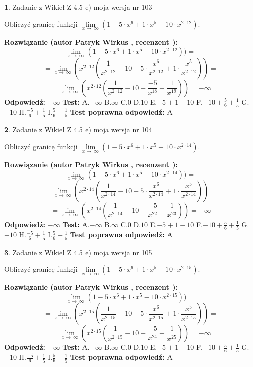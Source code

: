 \documentclass[12pt, a4paper]{article}
\theoremstyle{definition} %
\newtheorem{zad}{}
\newcommand{\zadStart}[1]{\begin{zad}#1\newline}
\newcommand{\zadStop}{\end{zad}}
\newcommand{\rozwStart}[2]{\noindent \textbf{Rozwiązanie (autor #1 , recenzent #2): }\newline}
\newcommand{\rozwStop}{\newline}
\newcommand{\odpStart}{\noindent \textbf{Odpowiedź:}\newline}
\newcommand{\odpStop}{\newline}
\newcommand{\testStart}{\noindent \textbf{Test:}\newline}
\newcommand{\testStop}{\newline}
\newcommand{\kluczStart}{\noindent \textbf{Test poprawna odpowiedź:}\newline}
\newcommand{\kluczStop}{\newline}
\begin{document}
\zadStart{Zadanie z Wikieł Z 4.5 e) moja wersja nr 103}



Obliczyć granicę funkcji  $\lim\limits_{x\to\ \infty}(1 - 5 \cdot x^{6}+1 \cdot x^{5}- 10 \cdot x^{2\cdot12})$.
\zadStop
\rozwStart{Patryk Wirkus}{}
$$\lim\limits_{x\to\ \infty}(1 - 5 \cdot x^{6}+1 \cdot x^{5}- 10 \cdot x^{2\cdot12}))=$$
$$=\lim\limits_{x\to\ \infty}(x^{2\cdot12}(\frac{1}{x^{2\cdot12}}-10 -5 \cdot \frac{x^{6}}{x^{2\cdot12}}+1 \cdot \frac{x^{5}}{x^{2\cdot12}}))=$$
$$=\lim\limits_{x\to\ \infty}(x^{2\cdot12}(\frac{1}{x^{2\cdot12}}-10 + \frac{-5}{x^{18}}+ \frac{1}{x^{19}}))=-\infty$$
\rozwStop
\odpStart
$-\infty$
\odpStop
\testStart
A.$-\infty$ B.$\infty$ C.$0$ D.$10$ E.$-5 + 1 - 10$
F.$-10+\frac{5}{6}+\frac{1}{5}$ G.$-10$
H.$\frac{-5}{6}+\frac{1}{5}$
I.$\frac{5}{6}+\frac{1}{5}$
\testStop
\kluczStart
A
\kluczStop



\zadStart{Zadanie z Wikieł Z 4.5 e) moja wersja nr 104}



Obliczyć granicę funkcji  $\lim\limits_{x\to\ \infty}(1 - 5 \cdot x^{6}+1 \cdot x^{5}- 10 \cdot x^{2\cdot14})$.
\zadStop
\rozwStart{Patryk Wirkus}{}
$$\lim\limits_{x\to\ \infty}(1 - 5 \cdot x^{6}+1 \cdot x^{5}- 10 \cdot x^{2\cdot14}))=$$
$$=\lim\limits_{x\to\ \infty}(x^{2\cdot14}(\frac{1}{x^{2\cdot14}}-10 -5 \cdot \frac{x^{6}}{x^{2\cdot14}}+1 \cdot \frac{x^{5}}{x^{2\cdot14}}))=$$
$$=\lim\limits_{x\to\ \infty}(x^{2\cdot14}(\frac{1}{x^{2\cdot14}}-10 + \frac{-5}{x^{22}}+ \frac{1}{x^{23}}))=-\infty$$
\rozwStop
\odpStart
$-\infty$
\odpStop
\testStart
A.$-\infty$ B.$\infty$ C.$0$ D.$10$ E.$-5 + 1 - 10$
F.$-10+\frac{5}{6}+\frac{1}{5}$ G.$-10$
H.$\frac{-5}{6}+\frac{1}{5}$
I.$\frac{5}{6}+\frac{1}{5}$
\testStop
\kluczStart
A
\kluczStop



\zadStart{Zadanie z Wikieł Z 4.5 e) moja wersja nr 105}



Obliczyć granicę funkcji  $\lim\limits_{x\to\ \infty}(1 - 5 \cdot x^{6}+1 \cdot x^{5}- 10 \cdot x^{2\cdot15})$.
\zadStop
\rozwStart{Patryk Wirkus}{}
$$\lim\limits_{x\to\ \infty}(1 - 5 \cdot x^{6}+1 \cdot x^{5}- 10 \cdot x^{2\cdot15}))=$$
$$=\lim\limits_{x\to\ \infty}(x^{2\cdot15}(\frac{1}{x^{2\cdot15}}-10 -5 \cdot \frac{x^{6}}{x^{2\cdot15}}+1 \cdot \frac{x^{5}}{x^{2\cdot15}}))=$$
$$=\lim\limits_{x\to\ \infty}(x^{2\cdot15}(\frac{1}{x^{2\cdot15}}-10 + \frac{-5}{x^{24}}+ \frac{1}{x^{25}}))=-\infty$$
\rozwStop
\odpStart
$-\infty$
\odpStop
\testStart
A.$-\infty$ B.$\infty$ C.$0$ D.$10$ E.$-5 + 1 - 10$
F.$-10+\frac{5}{6}+\frac{1}{5}$ G.$-10$
H.$\frac{-5}{6}+\frac{1}{5}$
I.$\frac{5}{6}+\frac{1}{5}$
\testStop
\kluczStart
A
\kluczStop
\end{document}
